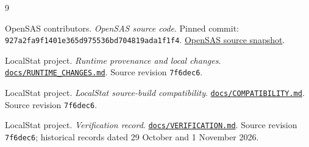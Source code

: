 \documentclass[11pt,a4paper]{article}
\newcommand{\localstatrevision}{7f6dec6537cc9e9ca9f9c37961b8b6811c5b7aff}
\begin{document}
\begin{thebibliography}{9}
\raggedright

OpenSAS contributors.
\emph{OpenSAS source code}.
Pinned commit:
\texttt{927a2fa9f1401e365d975536bd704819ada1f1f4}.
\href{https://github.com/kirha-ai/opensas/tree/927a2fa9f1401e365d975536bd704819ada1f1f4}{OpenSAS source snapshot}.

LocalStat project.
\emph{Runtime provenance and local changes}.
\href{https://github.com/hafiz122/localstat/blob/\localstatrevision/docs/RUNTIME_CHANGES.md}{\texttt{docs/RUNTIME\_CHANGES.md}}.
Source revision \texttt{7f6dec6}.

LocalStat project.
\emph{LocalStat source-build compatibility}.
\href{https://github.com/hafiz122/localstat/blob/\localstatrevision/docs/COMPATIBILITY.md}{\texttt{docs/COMPATIBILITY.md}}.
Source revision \texttt{7f6dec6}.

LocalStat project.
\emph{Verification record}.
\href{https://github.com/hafiz122/localstat/blob/\localstatrevision/docs/VERIFICATION.md}{\texttt{docs/VERIFICATION.md}}.
Source revision \texttt{7f6dec6}; historical records dated
29 October and 1 November 2026.

\end{thebibliography}
\end{document}
